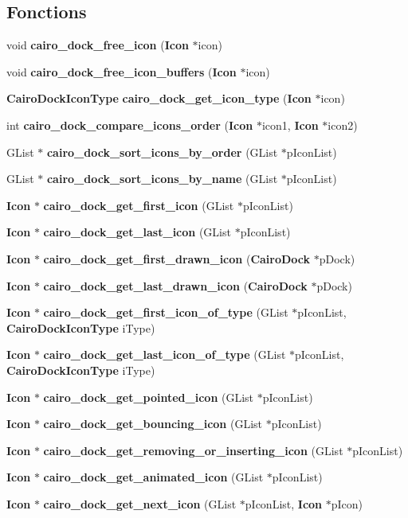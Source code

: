 \subsection*{Fonctions}
\begin{CompactItemize}
\item 
void {\bf cairo\_\-dock\_\-free\_\-icon} ({\bf Icon} $\ast$icon)
\item 
void {\bf cairo\_\-dock\_\-free\_\-icon\_\-buffers} ({\bf Icon} $\ast$icon)
\item 
{\bf CairoDockIconType} {\bf cairo\_\-dock\_\-get\_\-icon\_\-type} ({\bf Icon} $\ast$icon)
\item 
int {\bf cairo\_\-dock\_\-compare\_\-icons\_\-order} ({\bf Icon} $\ast$icon1, {\bf Icon} $\ast$icon2)
\item 
GList $\ast$ {\bf cairo\_\-dock\_\-sort\_\-icons\_\-by\_\-order} (GList $\ast$pIconList)
\item 
GList $\ast$ {\bf cairo\_\-dock\_\-sort\_\-icons\_\-by\_\-name} (GList $\ast$pIconList)
\item 
{\bf Icon} $\ast$ {\bf cairo\_\-dock\_\-get\_\-first\_\-icon} (GList $\ast$pIconList)
\item 
{\bf Icon} $\ast$ {\bf cairo\_\-dock\_\-get\_\-last\_\-icon} (GList $\ast$pIconList)
\item 
{\bf Icon} $\ast$ {\bf cairo\_\-dock\_\-get\_\-first\_\-drawn\_\-icon} ({\bf CairoDock} $\ast$pDock)
\item 
{\bf Icon} $\ast$ {\bf cairo\_\-dock\_\-get\_\-last\_\-drawn\_\-icon} ({\bf CairoDock} $\ast$pDock)
\item 
{\bf Icon} $\ast$ {\bf cairo\_\-dock\_\-get\_\-first\_\-icon\_\-of\_\-type} (GList $\ast$pIconList, {\bf CairoDockIconType} iType)
\item 
{\bf Icon} $\ast$ {\bf cairo\_\-dock\_\-get\_\-last\_\-icon\_\-of\_\-type} (GList $\ast$pIconList, {\bf CairoDockIconType} iType)
\item 
{\bf Icon} $\ast$ {\bf cairo\_\-dock\_\-get\_\-pointed\_\-icon} (GList $\ast$pIconList)
\item 
{\bf Icon} $\ast$ {\bf cairo\_\-dock\_\-get\_\-bouncing\_\-icon} (GList $\ast$pIconList)
\item 
{\bf Icon} $\ast$ {\bf cairo\_\-dock\_\-get\_\-removing\_\-or\_\-inserting\_\-icon} (GList $\ast$pIconList)
\item 
{\bf Icon} $\ast$ {\bf cairo\_\-dock\_\-get\_\-animated\_\-icon} (GList $\ast$pIconList)
\item 
{\bf Icon} $\ast$ {\bf cairo\_\-dock\_\-get\_\-next\_\-icon} (GList $\ast$pIconList, {\bf Icon} $\ast$pIcon)

\end{CompactItemize}
